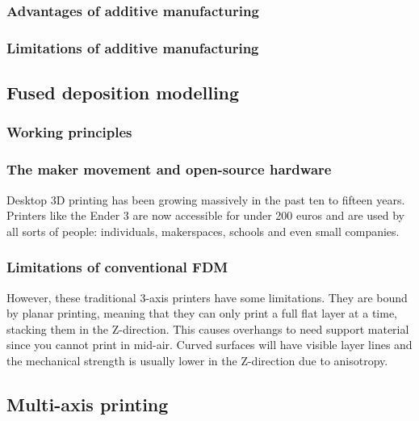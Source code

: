 \subsubsection{Advantages of additive manufacturing}
\label{subsubsec:intro-am-advantages}

\subsubsection{Limitations of additive manufacturing}
\label{subsubsec:intro-am-limitations}

\subsection{Fused deposition modelling}
\label{subsec:intro-fdm}

\subsubsection{Working principles}
\label{subsubsec:intro-fdm-principles}

\subsubsection{The maker movement and open-source hardware}
\label{subsubsec:intro-maker-movement}
Desktop 3D printing has been growing massively in the past ten to fifteen years. Printers like the Ender 3 are now accessible for under 200 euros and are used by all sorts of people: individuals, makerspaces, schools and even small companies.

\subsubsection{Limitations of conventional FDM}
\label{subsubsec:intro-fdm-limitations}
However, these traditional 3-axis printers have some limitations. They are bound by planar printing, meaning that they can only print a full flat layer at a time, stacking them in the Z-direction. This causes overhangs to need support material since you cannot print in mid-air. Curved surfaces will have visible layer lines and the mechanical strength is usually lower in the Z-direction due to anisotropy.

\subsection{Multi-axis printing}
\label{subsec:intro-multi-axis}

